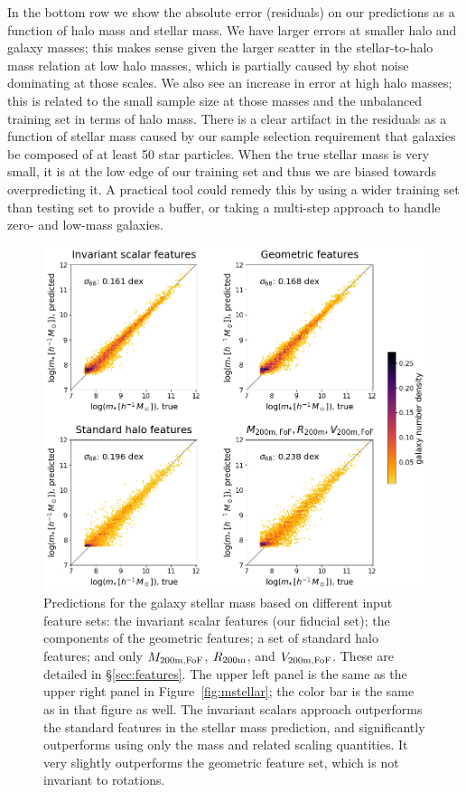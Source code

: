 In the bottom row we show the absolute error (residuals) on our predictions as a function of halo mass and stellar mass.
We have larger errors at smaller halo and galaxy masses; this makes sense given the larger scatter in the stellar-to-halo mass relation at low halo masses, which is partially caused by shot noise dominating at those scales.
We also see an increase in error at high halo masses; this is related to the small sample size at those masses and the unbalanced training set in terms of halo mass.
There is a clear artifact in the residuals as a function of stellar mass caused by our sample selection requirement that galaxies be composed of at least 50 star particles.
When the true stellar mass is very small, it is at the low edge of our training set and thus we are biased towards overpredicting it.
A practical tool could remedy this by using a wider training set than testing set to provide a buffer, or taking a multi-step approach to handle zero- and low-mass galaxies.  


\begin{figure}
    \centering
    \includegraphics[width=0.7\columnwidth]{feature_comparison_mstellar.png}
    \caption{Predictions for the galaxy stellar mass based on different input feature sets: the invariant scalar features (our fiducial set); the components of the geometric features; a set of standard halo features; and only $M_\mathrm{200m,FoF}$, $R_\mathrm{200m}$, and $V_\mathrm{200m,FoF}$. These are detailed in \S\ref{sec:features}. The upper left panel is the same as the upper right panel in Figure~\ref{fig:mstellar}; the color bar is the same as in that figure as well. The invariant scalars approach outperforms the standard features in the stellar mass prediction, and significantly outperforms using only the mass and related scaling quantities. It very slightly outperforms the geometric feature set, which is not invariant to rotations.}
    \label{fig:mstellar_compare}
\end{figure}

